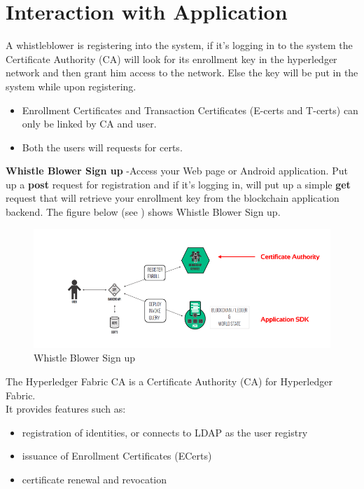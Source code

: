 \chapter{Interaction with Application
	\label{ch:Interaction with Application}}

A whistleblower is registering into the system, if it’s logging in to the system the Certificate Authority (CA) will look for its enrollment key in the hyperledger network and then grant him access to the network. Else the key will be put in the system while upon registering. 
\begin{itemize}
	\item	Enrollment Certificates and Transaction Certificates (E-certs and T-certs) can only be linked by CA and user. 
	\item 	Both the users will requests for certs. 
\end{itemize}
\textbf{Whistle Blower Sign up }-Access your Web page or Android application. Put up a \textbf{post }  request for  
registration and if it’s logging in, will put up a simple \textbf{ get } request that will retrieve your   
enrollment key from the blockchain application backend. The figure below (see ) shows Whistle Blower Sign up.\\ 
\begin{figure}[h]
	\centering
	\includegraphics[scale=0.90]{figures/06.png}
	\caption{Whistle Blower Sign up }
	\label{fig:istl}
\end{figure}  
The Hyperledger Fabric CA is a Certificate Authority (CA) for Hyperledger Fabric.\\
It provides features such as:
\begin{itemize}
	\item	registration of identities, or connects to LDAP as the user registry 
	\item 		issuance of Enrollment Certificates (ECerts)
	\item 		certificate renewal and revocation
\end{itemize}
